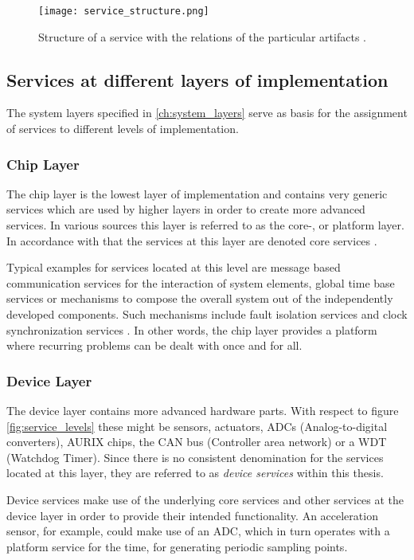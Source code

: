 \begin{figure}[!htbp]
\centering
\texttt{[image: service\_structure.png]}
\caption{Structure of a service with the relations of the particular artifacts \cite[p.45]{krafzig}.}
\label{fig:service}
\end{figure}




\subsection{Services at different layers of implementation}
\label{ch:service_layers}
The system layers specified in \ref{ch:system_layers} serve as basis for the assignment of services to different levels of implementation.

\subsubsection{Chip Layer}
The chip layer is the lowest layer of implementation and contains very generic services which are used by higher layers in order to create more advanced services. In various sources this layer is referred to as the core-, or platform layer. In accordance with that the services at this layer are denoted core services \cite[p.44]{genesys}.

Typical examples for services located at this level are message based 
communication services for the interaction of system elements, global time base services or mechanisms to compose the overall system out of the independently developed components. Such mechanisms include fault isolation services and clock synchronization services \cite[p.7-12]{genesys}. In other words, the chip layer provides a platform where recurring problems can be dealt with once and for all.

\subsubsection{Device Layer}
The device layer contains more advanced hardware parts. With respect to figure \ref{fig:service_levels} these might be sensors, actuators, ADCs (Analog-to-digital converters), AURIX chips, the CAN bus (Controller area network) or a WDT (Watchdog Timer). Since there is no consistent denomination for the services located at this layer, they are referred to as \emph{device services} within this thesis.

Device services make use of the underlying core services and other services at the device layer in order to provide their intended functionality. 
An acceleration sensor, for example, could make use of an ADC, which in turn operates with a platform service for the time, for generating periodic sampling points.

